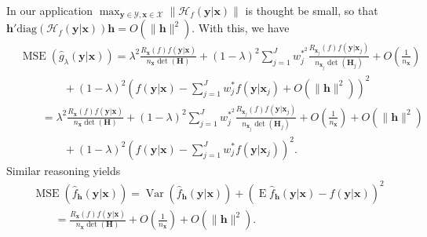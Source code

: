 \documentclass[11pt]{article}
\newcommand{\Y}{\mathcal{Y}}
\newcommand{\X}{\mathcal{X}}
\newcommand{\Hcal}{\mathcal{H}}
\newcommand{\Hbf}{\textbf{H}}
\newcommand{\y}{\textbf{y}}
\newcommand{\x}{\textbf{x}}
\newcommand{\h}{\textbf{h}}
\newcommand{\wstar}{w^{\textstyle{*}}}
\newcommand{\wstarsq}{w^{\textstyle{*}^2}}
\DeclareMathOperator{\E}{E}
\DeclareMathOperator{\Var}{Var}
\DeclareMathOperator{\MSE}{MSE}
\begin{document}
In our application $\max_{\y \in \Y, \x \in \X}\|\Hcal_f(\y|\x)\|$ is thought be small, so that $\h'\text{diag}(\Hcal_f(\y|\x))\h = O(\|\h\|^2)$. With this, we have
\begin{align*}
  &\MSE(\hat g_\lambda(\y|\x)) = \lambda^2 \frac{R_{\x}(f)f(\y|\x)}{n_\x\det(\Hbf)} 
    + (1 - \lambda)^2\sum_{j=1}^J\wstarsq_j\frac{R_{\x_j}(f)f(\y|\x_j)}{n_{\x_j}\det(\Hbf_j)}
    + O\left(\frac{1}{n_\x}\right) \\
    &\qquad\qquad+ (1-\lambda)^2\left(f(\y|\x) - \sum_{j=1}^J\wstar_jf(\y|\x_j) 
    + O(\|\h\|^2)\right)^2 \\
  &\qquad=  \lambda^2 \frac{R_{\x}(f)f(\y|\x)}{n_\x\det(\Hbf)} 
    + (1 - \lambda)^2\sum_{j=1}^J\wstarsq_j\frac{R_{\x_j}(f)f(\y|\x_j)}{n_{\x_j}\det(\Hbf_j)}
    + O\left(\frac{1}{n_\x}\right) + O(\|\h\|^2) \\
    &\qquad\qquad+ (1-\lambda)^2\left(f(\y|\x) - \sum_{j=1}^J\wstar_jf(\y|\x_j)\right)^2.
\end{align*}
Similar reasoning yields
\begin{align*}
  &\MSE(\hat f_\h(\y|\x)) = \Var\left(\hat f_\h(\y|\x)\right) 
    + \left(\E\hat f_\h(\y|\x) - f(\y|\x)\right)^2 \\
  &\qquad= \frac{R_{\x}(f)f(\y|\x)}{n_\x\det(\Hbf)} + O\left(\frac{1}{n_\x}\right) + O(\|\h\|^2).
\end{align*}
\end{document}
